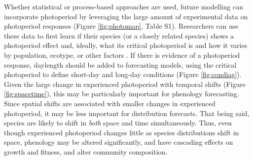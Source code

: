 \documentclass{article}
\begin{document}
\par Whether statistical or process-based approaches are used, future modelling can incorporate photoperiod by leveraging the large amount of experimental data on photoperiod responses (Figure \ref{fig:photomap}, Table S1). Researchers can use these data to first learn if their species (or a closely related species) shows a photoperiod effect and, ideally, what its critical photoperiod is and how it varies by population, ecotype, or other factors \citep{bradshaw2006,gwinner1996,tobin2008}. If there is evidence of a photoperiod response, daylength should be added to forecasting models, using the critical photoperiod to define short-day and long-day conditions (Figure \ref{fig:condiag}). Given the large change in experienced photoperiod with temporal shifts (Figure \ref{fig:spacetime}), this may be particularly important for phenology forecasting. Since spatial shifts are associated with smaller changes in experienced photoperiod, it may be less important for distribution forecasts.
That being said, species are likely to shift in \emph{both} space and time simultaneously. Thus, even though experienced photoperiod changes little as species distributions shift in space, phenology may be altered significantly, and have cascading effects on growth and fitness\citep{duputie2015}, and alter community  composition.
\end{document}
